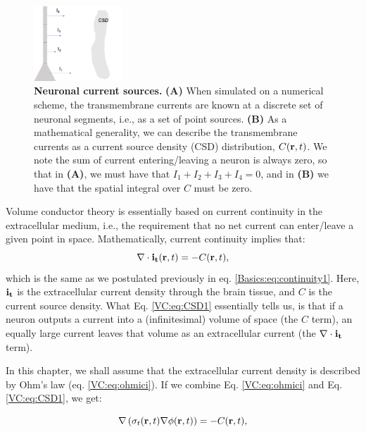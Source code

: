 \begin{figure}[!ht]
\begin{center}
\includegraphics[width=0.3\textwidth]{Figures/VC/CSD.png}
\end{center}
\caption{\textbf{Neuronal current sources.}  {\bf (A)} When simulated on a numerical scheme, the transmembrane currents are known at a discrete set of neuronal segments, i.e., as a set of point sources.  {\bf (B)} As a mathematical generality, we can describe the transmembrane currents as a current source density (CSD) distribution, $C({\bf r},t)$. We note the sum of current entering/leaving a neuron is always zero, so that in {\bf (A)}, we must have that $I_1 + I_2 + I_3 + I_4 = 0$, and in {\bf (B)} we have that the spatial integral over $C$ must be zero.
}
\label{VC:fig:CSD}
\end{figure}
Volume conductor theory is essentially based on current continuity in the extracellular medium, i.e., the requirement that no net current can enter/leave a given point in space. Mathematically, current continuity implies that:
\begin{equation}
\nabla \cdot {\bf i_t}({\bf r}, t) = - C({\bf r}, t),
\label{VC:eq:CSD1}
\end{equation}
which is the same as we postulated previously in eq. \ref{Basics:eq:continuity1}. Here, ${\bf i_t}$ is the extracellular current density through the brain tissue, and $C$ is the current source density. What Eq. \ref{VC:eq:CSD1} essentially tells us, is that if a neuron outputs a current into a (infinitesimal) volume of space (the $C$ term), an equally large current leaves that volume as an extracellular current (the $\nabla \cdot {\bf i_t}$ term).

In this chapter, we shall assume that the extracellular current density is described by Ohm's law (eq. \ref{VC:eq:ohmici}). If we combine Eq. \ref{VC:eq:ohmici} and Eq. \ref{VC:eq:CSD1}, we get:

\begin{equation}
\nabla \left( \sigma_t({\bf r}, t) \nabla \phi({\bf r}, t) \right) = - C({\bf r}, t),
\label{VC:eq:CSD2}
\end{equation}

